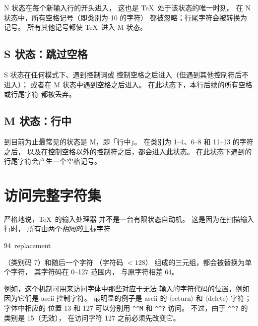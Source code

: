 \documentclass[a4paper]{rapport3}
\def\gr#1{$\langle$#1$\rangle$}\def\key#1{{\tt#1}}
\def\ascii{{\sc ascii}}
\newenvironment{tdisp}{\begin{quotation}}{\end{quotation}}
\def\term#1\par{\index{#1}}
\begin{document}
{\italic N} 状态在每个新输入行的开头进入，
这也是 \TeX\ 处于该状态的唯一时刻。
在 {\italic N} 状态中，所有空格记号（即类别为 10 的字符）
都被忽略；行尾字符会被转换为
 记号。
所有其他记号都使 \TeX\ 进入 {\italic M} 状态。

\subsection{{\italic S} 状态：跳过空格}

{\italic S} 状态在任何模式下、遇到控制词或
控制空格之后进入（但遇到其他控制符后不进入）；
或者在 {\italic M} 状态中遇到空格之后进入。
在此状态下，本行后续的所有空格或行尾字符
都被丢弃。

\subsection{{\italic M} 状态：行中}


到目前为止最常见的状态是 {\italic M}，即「行中」。
在类别为 1--4、6--8 和 11--13 的字符之后，
以及在控制空格以外的控制符之后，都会进入此状态。
在此状态下遇到的行尾字符会产生一个空格记号。

\relax %
\begin{tdisp}%
\leavevmode\relax
{}
\end{tdisp}


\section{访问完整字符集}
\label{hathat}

严格地说，\TeX\ 的输入处理器
并不是一台有限状态自动机。
这是因为在扫描输入行时，
所有由两个{\sl 相同的\/}上标字符
\term \char94\ replacement\par
（类别码 7）和随后一个字符
（字符码 $<128$）
组成的三元组，都会被替换为单个字符，
其字符码在 0--127 范围内，
与原字符相差 64。

例如，这个机制可用来访问字体中那些对应于无法
输入的字符代码的位置，例如因为它们是 \ascii{} 控制字符。
最明显的例子是 \ascii{} 的 \gr{return}
和 \gr{delete} 字符；字体中相应的
位置 13 和 127 可以分别用 \verb>^^M> 和 \verb>^^?> 访问。
不过，由于 \verb>^^?> 的类别是 15（无效），
在访问字符 127 之前必须先改变它。
\awp
\end{document}
